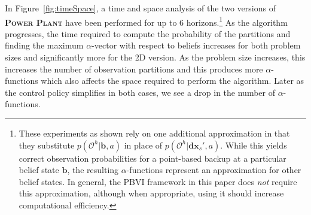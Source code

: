 \documentclass{article} %
\renewcommand{\vec}[1]{\mathbf{#1}} %
\newcommand{\xdsp}{\mathbf{dx}_s'}
\begin{document}
In Figure~\ref{fig:timeSpace}, a time and space analysis of the two
versions of \textsc{\bf Power Plant} have been performed for up to 6
horizons.\footnote{These experiments as shown rely on one additional
  approximation in that they substitute $p(\mathcal{O}^h|\vec{b},a)$
  in place of $p(\mathcal{O}^h|\xdsp,a)$.  While this yields correct
  observation probabilities for a point-based backup at a particular
  belief state $\vec{b}$, the resulting $\alpha$-functions represent
  an approximation for other belief states.  In general, the PBVI
  framework in this paper does \emph{not} require this approximation,
  although when appropriate, using it should increase computational
  efficiency.}  As the algorithm progresses, the time required to
compute the probability of the partitions and finding the maximum
$\alpha$-vector with respect to beliefs increases for both problem
sizes and significantly more for the 2D version.  As the problem size
increases, this increases the number of observation partitions and
this produces more $\alpha$-functions which also affects the space
required to perform the algorithm.  Later as the control policy
simplifies in both cases, we see a drop in the number of
$\alpha$-functions.


\end{document}
